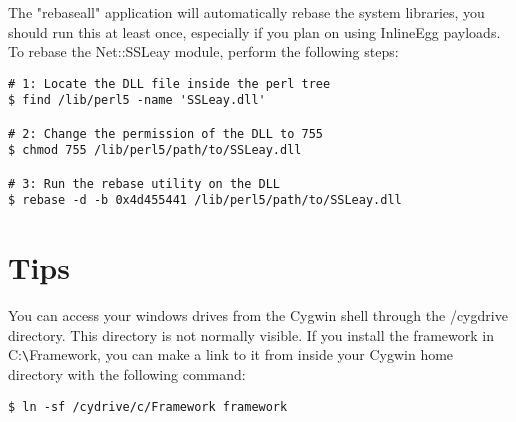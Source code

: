 \documentclass{report}
\begin{document}
\par
The "rebaseall" application will automatically rebase the system libraries, you
should run this at least once, especially if you plan on using InlineEgg payloads.
To rebase the Net::SSLeay module, perform the following steps:

\begin{verbatim}
# 1: Locate the DLL file inside the perl tree
$ find /lib/perl5 -name 'SSLeay.dll'

# 2: Change the permission of the DLL to 755
$ chmod 755 /lib/perl5/path/to/SSLeay.dll

# 3: Run the rebase utility on the DLL
$ rebase -d -b 0x4d455441 /lib/perl5/path/to/SSLeay.dll
\end{verbatim}


	\section{Tips}
\par
You can access your windows drives from the Cygwin shell through the /cygdrive
directory. This directory is not normally visible. If you install the framework
in C:\verb#\#Framework, you can make a link to it from inside your Cygwin home
directory with the following command: 

\begin{verbatim}
$ ln -sf /cydrive/c/Framework framework
\end{verbatim}
\end{document}

